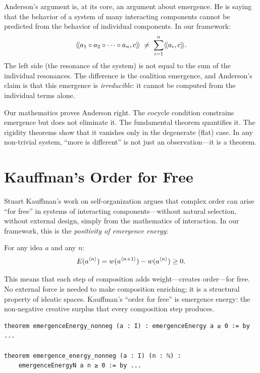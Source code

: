 Anderson's argument is, at its core, an argument about emergence. He is saying
that the behavior of a system of many interacting components cannot be predicted
from the behavior of individual components. In our framework:
\[
  \langle\!\langle a_1 \circ a_2 \circ \cdots \circ a_n, c \rangle\!\rangle
  \;\neq\; \sum_{i=1}^n \langle\!\langle a_i, c \rangle\!\rangle.
\]
The left side (the resonance of the system) is not equal to the sum of the
individual resonances. The difference is the coalition emergence, and Anderson's
claim is that this emergence is \emph{irreducible}: it cannot be computed from
the individual terms alone.

Our mathematics proves Anderson right. The cocycle condition constrains
emergence but does not eliminate it. The fundamental theorem quantifies it. The
rigidity theorems show that it vanishes only in the degenerate (flat) case.
In any non-trivial system, ``more is different'' is not just an observation---it
is a theorem.


\section{Kauffman's Order for Free}

Stuart Kauffman's work on self-organization argues that complex order can arise
``for free'' in systems of interacting components---without natural selection,
without external design, simply from the mathematics of interaction. In our
framework, this is the \emph{positivity of emergence energy}:

\begin{theorem}
\label{thm:energy-nonneg-nature}
For any idea $a$ and any $n$:
\[
  E(a^{\langle n \rangle}) = w(a^{\langle n+1 \rangle}) - w(a^{\langle n \rangle}) \geq 0.
\]
\end{theorem}

This means that each step of composition adds weight---creates order---for free.
No external force is needed to make composition enriching; it is a structural
property of ideatic spaces. Kauffman's ``order for free'' is emergence energy:
the non-negative creative surplus that every composition step produces.

\begin{lstlisting}[caption={Emergence energy (IDT\_v3\_Emergence.lean)}]
theorem emergenceEnergy_nonneg (a : I) : emergenceEnergy a ≥ 0 := by ...

theorem emergence_energy_nonneg (a : I) (n : ℕ) :
    emergenceEnergyN a n ≥ 0 := by ...
\end{lstlisting}


